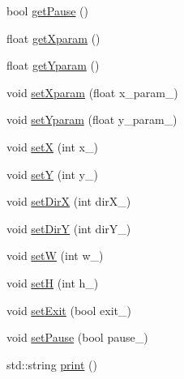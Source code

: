 \begin{DoxyCompactItemize}
\item 
bool \hyperlink{classbolinha_a416b5ee9e822606a0cc414f384619000}{get\+Pause} ()
\item 
float \hyperlink{classbolinha_af48d96c4fa8552bd44e9c5f3bb1724a5}{get\+Xparam} ()
\item 
float \hyperlink{classbolinha_a15fa13bcfd66f43b2e7c5f1d8416ea15}{get\+Yparam} ()
\item 
void \hyperlink{classbolinha_a92da76fdb57264e2edc33d96ddb3e4d4}{set\+Xparam} (float x\+\_\+param\+\_\+)
\item 
void \hyperlink{classbolinha_accc5d5fe698a340c6b085e3dad3d1af9}{set\+Yparam} (float y\+\_\+param\+\_\+)
\item 
void \hyperlink{classbolinha_aa96439a9d3655912359a58a2096f8adc}{setX} (int x\+\_\+)
\item 
void \hyperlink{classbolinha_a28c1acdaebe902ba404ac6873800d8bf}{setY} (int y\+\_\+)
\item 
void \hyperlink{classbolinha_a2196da39c838309cf723b1c25789deb0}{set\+DirX} (int dir\+X\+\_\+)
\item 
void \hyperlink{classbolinha_a6beb9dba4c6de15d103a9827cf5ea7c7}{set\+DirY} (int dir\+Y\+\_\+)
\item 
void \hyperlink{classbolinha_a67d6d1e736779f2bbc845860103cc8fc}{setW} (int w\+\_\+)
\item 
void \hyperlink{classbolinha_ac77f2965fe5b0fab4879d5eeb89b1560}{setH} (int h\+\_\+)
\item 
void \hyperlink{classbolinha_a69c7848b06c9436027e3e1d117b03b26}{set\+Exit} (bool exit\+\_\+)
\item 
void \hyperlink{classbolinha_af223163ae42634912c3e4cba05e48acd}{set\+Pause} (bool pause\+\_\+)
\item 
std\+::string \hyperlink{classbolinha_a046ccfd6e883d8f6d2c9501459ab89d1}{print} ()
\end{DoxyCompactItemize}
